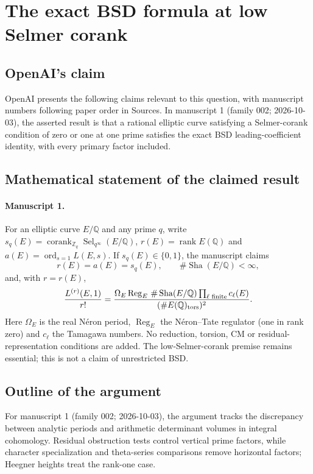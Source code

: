 \documentclass[11pt]{article}
\begin{document}
\section*{The exact BSD formula at low Selmer corank}

\subsection{OpenAI's claim}
OpenAI presents the following claims relevant to this question, with manuscript numbers following paper order in Sources. In manuscript 1 (family 002; 2026-10-03), the asserted result is that a rational elliptic curve satisfying a Selmer-corank condition of zero or one at one prime satisfies the exact BSD leading-coefficient identity, with every primary factor included.

\subsection{Mathematical statement of the claimed result}
\paragraph{Manuscript 1.}
For an elliptic curve $E/\mathbb Q$ and any prime $q$, write $s_q(E)=\operatorname{corank}_{\mathbb Z_q}\operatorname{Sel}_{q^{\infty}}(E/\mathbb Q)$, $r(E)=\operatorname{rank}E(\mathbb Q)$ and $a(E)=\operatorname{ord}_{s=1}L(E,s)$. If $s_q(E)\in\{0,1\}$, the manuscript claims
\[
 r(E)=a(E)=s_q(E),\qquad\#\operatorname{Sha}(E/\mathbb Q)<\infty,
\]
and, with $r=r(E)$,
\[
 \frac{L^{(r)}(E,1)}{r!}
 =\frac{\Omega_E\operatorname{Reg}_E\,\#\operatorname{Sha}(E/\mathbb Q)\prod_{\ell\text{ finite}}c_{\ell}(E)}
 {(\#E(\mathbb Q)_{\rm tors})^2}.
\]
Here $\Omega_E$ is the real N\'eron period, $\operatorname{Reg}_E$ the N\'eron--Tate regulator (one in rank zero) and $c_{\ell}$ the Tamagawa numbers. No reduction, torsion, CM or residual-representation conditions are added. The low-Selmer-corank premise remains essential; this is not a claim of unrestricted BSD.

\subsection{Outline of the argument}
For manuscript 1 (family 002; 2026-10-03), the argument tracks the discrepancy between analytic periods and arithmetic determinant volumes in integral cohomology. Residual obstruction tests control vertical prime factors, while character specialization and theta-series comparisons remove horizontal factors; Heegner heights treat the rank-one case.
\end{document}

